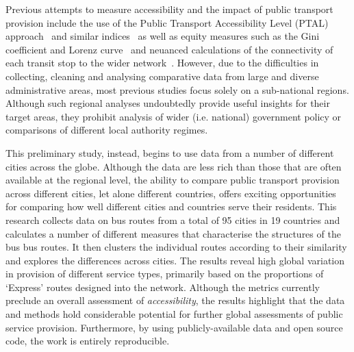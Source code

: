 \documentclass[11pt]{article}
\begin{document}
Previous attempts to measure accessibility and the impact of public transport provision include the use of the Public Transport Accessibility Level (PTAL) approach~\citep{wu_ptal_2003} and similar indices~\citep{currie_quantifying_2010, delbosc_using_2011} as well as equity measures such as the Gini coefficient and Lorenz curve~\citep{delbosc_using_2011} and neuanced calculations of the connectivity of each transit stop to the wider network~\citep{welch_measure_2013}. However, due to the difficulties in collecting, cleaning and analysing comparative data from large and diverse administrative areas, most previous studies focus solely on a sub-national regions. Although such regional analyses undoubtedly provide useful insights for their target areas, they prohibit analysis of wider (i.e. national) government policy or comparisons of different local authority regimes.

This preliminary study, instead, begins to use data from a number of different cities across the globe. Although the data are less rich than those that are often available at the regional level, the ability to compare public transport provision across different cities, let alone different countries, offers exciting opportunities for comparing how well different cities and countries serve their residents. This research collects data on bus routes from a total of 95 cities in 19 countries and calculates a number of different measures that characterise the structures of the bus bus routes. It then clusters the individual routes according to their similarity and explores the differences across cities. The results reveal high global variation in provision of different service types, primarily based on the proportions of `Express' routes designed into the network. Although the metrics currently preclude an overall assessment of \textit{accessibility}, the results highlight that the data and methods hold considerable potential for further global assessments of public service provision. Furthermore, by using publicly-available data and open source code, the work is entirely reproducible. 
\end{document}

